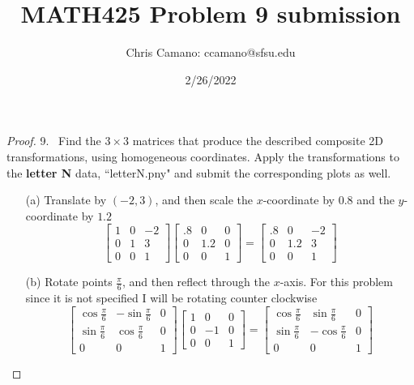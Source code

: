 \documentclass[12pt]{article}
\author{Chris Camano: ccamano@sfsu.edu}
\title{MATH425  Problem 9 submission}
\date{2/26/2022}
\begin{document}
\maketitle
\begin{proof}
  9.~  Find the $ 3 \times 3$ matrices that produce the described composite 2D transformations, using homogeneous coordinates. Apply the transformations to the {\bf letter N} data, ``letterN.pny" and submit the corresponding plots as well.
  \begin{itemize}
  \item[(a)] Translate by $(-2, 3)$, and then scale the $x$-coordinate by $0.8$ and the $y$-coordinate by $1.2$
  \[
    \begin{bmatrix}
      1&0&-2\\
      0&1&3\\
      0&0&1
    \end{bmatrix}
      \begin{bmatrix}
        .8&0&0\\
        0&1.2&0\\
        0&0&1
      \end{bmatrix}=\begin{bmatrix}
        .8&0&-2\\
        0&1.2&3\\
        0&0&1
      \end{bmatrix}
  \]
  \item[(b)] Rotate points $\frac{\pi}{6}$, and then reflect through the $x$-axis.
  For this problem since it is not specified I will be rotating counter clockwise
  \[
  \renewcommand{\arraystretch}{2.5}
    \begin{bmatrix}
      \cos{\frac{\pi}{6}}&-\sin{\frac{\pi}{6}}&0\\
      \sin{\frac{\pi}{6}}& \cos{\frac{\pi}{6}}&0\\
      0&0&1
    \end{bmatrix}
    \begin{bmatrix}
    1&0&0\\
          0&-1&0\\
      0&0&1
    \end{bmatrix}=\begin{bmatrix}
      \cos{\frac{\pi}{6}}&\sin{\frac{\pi}{6}}&0\\
      \sin{\frac{\pi}{6}}& -\cos{\frac{\pi}{6}}&0\\
      0&0&1
    \end{bmatrix}
  \]
  \end{itemize}
\end{proof}
\end{document}
